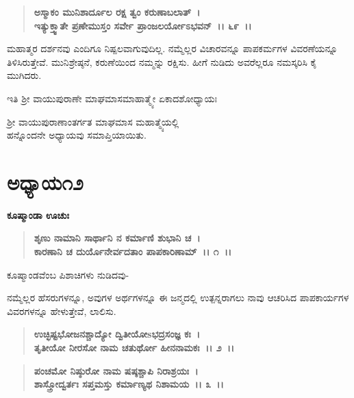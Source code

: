 \begin{verse}
\textbf{ಅಸ್ಮಾಕಂ ಮುನಿಶಾರ್ದೂಲ ರಕ್ಷ ತ್ವಂ ಕರುಣಾಬಲಾತ್~।}\\\textbf{ಇತ್ಯುಕ್ತ್ವಾತೇ ಪ್ರಣೇಮುಸ್ತಂ ಸರ್ವೇ ಪ್ರಾಂಜಲರ್ಯೋಽಭವನ್~।। ೬೯~।।}
\end{verse}

ಮಹಾತ್ಮರ ದರ್ಶನವು ಎಂದಿಗೂ ನಿಷ್ಪಲವಾಗುವುದಿಲ್ಲ. ನಮ್ಮೆಲ್ಲರ ವಿಚಾರವನ್ನೂ ಪಾಪಕರ್ಮಗಳ ವಿವರಣೆಯನ್ನೂ ತಿಳಿಸಿರುತ್ತೇವೆ. ಮುನಿಶ್ರೇಷ್ಠನೆ, ಕರುಣೆಯಿಂದ ನಮ್ಮನ್ನು ರಕ್ಷಿಸು. ಹೀಗೆ ನುಡಿದು ಅವರೆಲ್ಲರೂ ನಮಸ್ಕರಿಸಿ ಕೈ ಮುಗಿದರು.

\begin{center}
ಇತಿ ಶ‍್ರೀ ವಾಯುಪುರಾಣೇ ಮಾಘಮಾಸಮಾಹಾತ್ಮ್ಯೇ ಏಕಾದಶೋಧ್ಯಾಯಃ 
\end{center}

\begin{center}
ಶ‍್ರೀ ವಾಯುಪುರಾಣಾಂತರ್ಗತ ಮಾಘಮಾಸ ಮಹಾತ್ಮ್ಯೆಯಲ್ಲಿ \\ ಹನ್ನೊಂದನೇ ಅಧ್ಯಾಯವು ಸಮಾಪ್ತಿಯಾಯಿತು.
\end{center}

\newpage

\section*{ಅಧ್ಯಾಯ\enginline{-}೧೨}

\emptypage

\begin{flushleft}
\textbf{ಕೂಷ್ಮಾಂಡಾ ಊಚುಃ\enginline{-}}
\end{flushleft}

\begin{verse}
\textbf{ಶೃಣು ನಾಮಾನಿ ಸಾರ್ಥಾನಿ ನ ಕರ್ಮಾಣಿ ಶುಭಾನಿ ಚ~।}\\\textbf{ಕಾರಣಾನಿ ಚ ದುರ್ಯೊನೇರ್ವದತಾಂ ಪಾಪಕಾರಿಣಾಮ್~।। ೧~।। }
\end{verse}

\begin{flushleft}
ಕೂಷ್ಮಾಂಡವೆಂಬ ಪಿಶಾಚಿಗಳು ನುಡಿದವು-
\end{flushleft}

ನಮ್ಮೆಲ್ಲರ ಹೆಸರುಗಳನ್ನೂ, ಅವುಗಳ ಅರ್ಥಗಳನ್ನೂ ಈ ಜನ್ಮದಲ್ಲಿ ಉತ್ಪನ್ನರಾಗಲು ನಾವು ಆಚರಿಸಿದ ಪಾಪಕಾರ್ಯಗಳ ವಿವರಗಳನ್ನೂ ಹೇಳುತ್ತೇವೆ, ಲಾಲಿಸು.

\begin{verse}
\textbf{ಉಚ್ಛಿಷ್ಟಭೋಜನಶ್ಚಾದ್ಯೋ ದ್ವಿತೀಯೋsಭದ್ರಸಂಜ್ಞ ಕಃ~।}\\\textbf{ತೃತೀಯೋ ನೀರಸೋ ನಾಮ ಚತುರ್ಥೋ ಹೀನನಾಮಕಃ~।। ೨~।। }
\end{verse}

\begin{verse}
\textbf{ಪಂಚಮೋ ನಿಷ್ಠುರೋ ನಾಮ ಷಷ್ಠಶ್ಚಾಪಿ ನಿರಾಶ್ರಯಃ~।}\\\textbf{ಶಾಸ್ತ್ರೋದ್ವರ್ತಃ ಸಪ್ತಮಸ್ತು ಕರ್ಮಾಣ್ಯಥ ನಿಶಾಮಯ~।। ೩~।।}
\end{verse}

